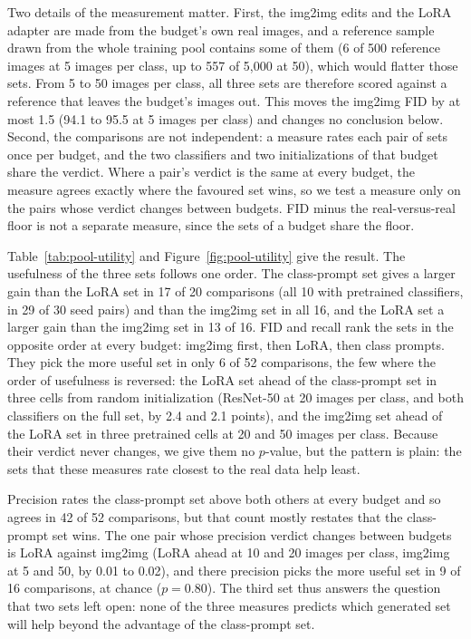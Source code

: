 \documentclass{scrartcl}
\begin{document}
Two details of the measurement matter. First, the img2img edits and the LoRA adapter are made from the
budget's own real images, and a reference sample drawn from the whole training pool contains some of them
(6 of 500 reference images at 5 images per class, up to 557 of 5,000 at 50), which would flatter those sets.
From 5 to 50 images per class, all three sets are therefore scored against a reference that leaves the
budget's images out. This moves the img2img FID by at most 1.5 (94.1 to 95.5 at 5 images per class) and
changes no conclusion below. Second, the comparisons are not independent: a measure rates each pair of
sets once per budget, and the two classifiers and two initializations of that budget share the verdict.
Where a pair's verdict is the same at every budget, the measure agrees exactly where the favoured set wins,
so we test a measure only on the pairs whose verdict changes between budgets. FID minus the
real-versus-real floor is not a separate measure, since the sets of a budget share the floor.

Table~\ref{tab:pool-utility} and Figure~\ref{fig:pool-utility} give the result. The usefulness of the three
sets follows one order. The class-prompt set gives a larger gain than the LoRA set in 17 of 20 comparisons
(all 10 with pretrained classifiers, in 29 of 30 seed pairs) and than the img2img set in all 16, and the
LoRA set a larger gain than the img2img set in 13 of 16. FID and recall rank the sets in the opposite order
at every budget: img2img first, then LoRA, then class prompts. They pick the more useful set in only 6 of 52
comparisons, the few where the order of usefulness is reversed: the LoRA set ahead of the class-prompt set
in three cells from random initialization (ResNet-50 at 20 images per class, and both classifiers on the
full set, by 2.4 and 2.1 points), and the img2img set ahead of the LoRA set in three pretrained cells at 20
and 50 images per class. Because their verdict never changes, we give them no $p$-value, but the pattern is
plain: the sets that these measures rate closest to the real data help least.

Precision rates the class-prompt set above both others at every budget and so agrees in 42 of 52
comparisons, but that count mostly restates that the class-prompt set wins. The one pair whose precision
verdict changes between budgets is LoRA against img2img (LoRA ahead at 10 and 20 images per class, img2img
at 5 and 50, by 0.01 to 0.02), and there precision picks the more useful set in 9 of 16 comparisons, at
chance ($p = 0.80$). The third set thus answers the question that two sets left open: none of the three
measures predicts which generated set will help beyond the advantage of the class-prompt set.
\end{document}
